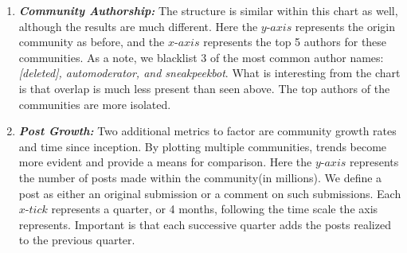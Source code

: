 \documentclass[b0paper,margin=1cm,landscape]{baposter}
\begin{document}
\begin{poster}
{\begin{enumerate}
    \vspace{1em}
    \item \textsl{\textbf{Community Authorship:}}
    \subitem The structure is similar within this chart as well, although the results are much different. 
    Here the $y$-$axis$ represents the origin community as before, and the $ x $-$ axis $ represents the top 5 authors for these communities.
    As a note, we blacklist 3 of the most common author names: \textit{[deleted], automoderator, and sneakpeekbot}.
    What is interesting from the chart is that overlap is much less present than seen above. The top authors of the communities are more isolated. 
    
    \vspace{1em}
    \item \textsl{\textbf{Post Growth:}}
    \subitem Two additional metrics to factor are community growth rates and time since inception. 
    By plotting multiple communities, trends become more evident and provide a means for comparison. 
    Here the $y$-$axis$ represents the number of posts made within the community(in millions). 
    We define a post as either an original submission or a comment on such submissions. 
    Each $x$-$tick$ represents a quarter, or 4 months, following the time scale the axis represents. 
    Important is that each successive quarter adds the posts realized to the previous quarter.
    

\end{enumerate}}
\end{poster}
\end{document}
